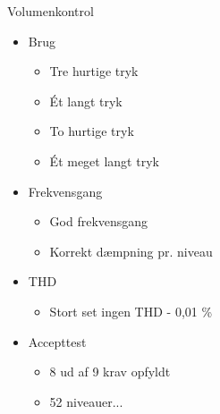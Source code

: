 \documentclass{beamer}
\begin{document}
\begin{frame}{Volumenkontrol}
\begin{itemize}
\item Brug
\begin{itemize}
\item Tre hurtige tryk
\item Ét langt tryk
\item To hurtige tryk
\item Ét meget langt tryk
\end{itemize}

\item Frekvensgang
\begin{itemize}
\item God frekvensgang
\item Korrekt dæmpning pr. niveau
\end{itemize}

\item THD
\begin{itemize}
\item Stort set ingen THD - 0,01 \%
\end{itemize}

\item Accepttest
\begin{itemize}
\item 8 ud af 9 krav opfyldt
\item 52 niveauer...
\end{itemize}

\end{itemize}
\end{frame}
\end{document}
